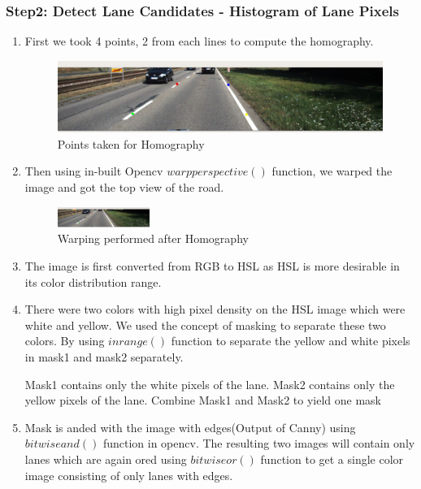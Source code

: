 \documentclass[12pt]{article}
\begin{document}
\subsubsection{Step2: Detect Lane Candidates - Histogram of Lane Pixels}
\begin{enumerate}
\item First we took 4 points, 2  from each lines to compute the homography.
\begin{figure}[h]
    \centering
    \includegraphics[width=14cm]{homographypoints}
    \caption{Points taken for Homography}
    \label{fig:homographypoints}
\end{figure}

\item Then using in-built Opencv $warpperspective()$ function, we warped the image and got the top view of the road.
\begin{figure}[h]
    \centering
    \includegraphics[width=3cm]{homography}
    \caption{Warping performed after Homography}
    \label{fig:homography}
\end{figure}

\item The image is first converted from RGB to HSL as HSL is more desirable in its color distribution range.

\item There were two colors with high pixel density on the HSL image which were white and yellow. We used the concept of masking to separate these two colors. By using $inrange()$ function to separate the yellow and white pixels in mask1 and mask2 separately.

Mask1 contains only the white pixels of the lane.
Mask2 contains only the yellow pixels of the lane.
Combine Mask1 and Mask2 to yield one mask 

\item Mask is anded with the image with edges(Output of Canny) using $bitwiseand()$ function in opencv. The resulting two images will contain only lanes which are again ored using $bitwiseor()$ function to get a single color image consisting of only lanes with edges. 


\end{enumerate}
\end{document}

